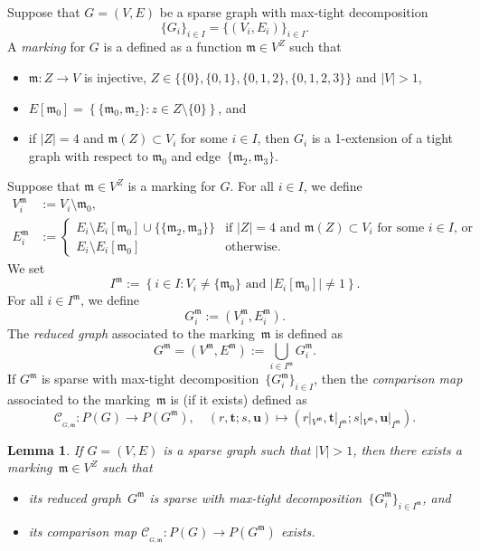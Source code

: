 \documentclass[12pt]{article}
\newtheorem{lemma}{Lemma}
\theoremstyle{definition}
\newenvironment{Mlist}{\begin{itemize}[topsep=0pt,itemsep=0pt,leftmargin=7mm]}{\end{itemize}}
\newcommand{\df}[1]{{\it #1}}
\newcommand{\st}{such that }
\newcommand{\wrt}{with respect to }
\renewcommand{\c}{\colon}
\newcommand{\set}[2]{\left\{#1:#2\right\}}
\newcommand{\cC}{\mathcal{C}}
\newcommand{\bt}{\mathbf{t}}
\newcommand{\bu}{\mathbf{u}}
\newcommand{\m}{\mathfrak{m}}
\newcommand{\CM}{\cC_{_{G,\m}}}
\begin{document}
Suppose that $G=(V,E)$ be a sparse graph with max-tight decomposition
\[
\{G_i\}_{i\in I}=\{(V_i,E_i)\}_{i\in I}.
\]
A \df{marking} for $G$ is a defined as a function $\m\in V^Z$ \st
\begin{Mlist}
\item
$\m\c Z\to V$ is injective, $Z\in\{\{0\},\{0,1\},\{0,1,2\},\{0,1,2,3\}\}$
and $|V|>1$,
\item
$E[\m_0]=\set{\{\m_0,\m_z\}}{z\in Z\setminus\{0\}}$, and
\item
if $|Z|=4$ and $\m(Z)\subset V_i$ for some $i\in I$,
then $G_i$ is a 1-extension of a tight graph \wrt $\m_0$ and edge~$\{\m_2,\m_3\}$.
\end{Mlist}
Suppose that $\m\in V^Z$ is a marking for $G$.
For all $i\in I$, we define
\begin{align*}
V^\m_i&:=V_i\setminus\m_0,
\\
E^\m_i&:=
\begin{cases}
E_i\setminus E_i[\m_0]\cup\{\{\m_2,\m_3\}\} & \text{if $|Z|=4$ and $\m(Z)\subset V_i$ for some $i\in I$, or}\\
E_i\setminus E_i[\m_0] & \text{otherwise}.
\end{cases}
\end{align*}
We set
\[
I^\m:=\set{i\in I}{V_i\neq\{\m_0\} \text{ and } |E_i[\m_0]|\neq1}.
\]
For all $i\in I^\m$, we define
\[
G^\m_i:=(V^\m_i,E^\m_i).
\]
The \df{reduced graph} associated to the marking~$\m$ is defined as
\[
G^\m=(V^\m,E^\m):=\bigcup_{i\in I^\m} G^\m_i.
\]
If $G^\m$ is sparse with max-tight decomposition~$\{G^\m_i\}_{i\in I}$, then
the \df{comparison map} associated to the marking~$\m$
is (if it exists) defined as
\[
\CM\c P(G)\to P(G^\m),\quad
(r,\bt;s,\bu)
\mapsto
(r|_{V^\m},\bt|_{I^\m};s|_{V^\m},\bu|_{I^\m}).
\]

\begin{lemma}
\label{lem:cm}
If $G=(V,E)$ is a sparse graph \st $|V|>1$, then
there exists a marking~$\m\in V^Z$ \st
\begin{Mlist}
\item its reduced graph~$G^\m$ is sparse with max-tight decomposition~$\{G^\m_i\}_{i\in I^\m}$, and
\item its comparison map $\CM\c P(G)\to P(G^\m)$ exists.
\end{Mlist}
\end{lemma}
\end{document}
